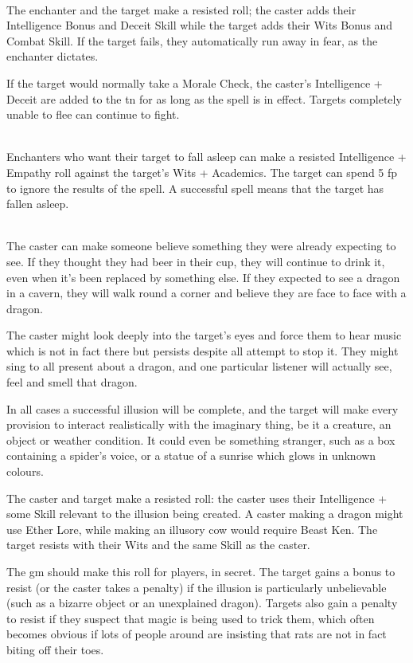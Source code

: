 \begin{multicols}{2}
\\
The enchanter and the target make a resisted roll; the caster adds their Intelligence Bonus and Deceit Skill while the target adds their Wits Bonus and Combat Skill. If the target fails, they automatically run away in fear, as the enchanter dictates.

If the target would normally take a Morale Check, the caster's Intelligence + Deceit are added to the \gls{tn} for as long as the spell is in effect.
Targets completely unable to flee can continue to fight.

\\
Enchanters who want their target to fall asleep can make a resisted Intelligence + Empathy roll against the target's Wits + Academics.
The target can spend 5 \gls{fp} to ignore the results of the spell. A successful spell means that the target has fallen asleep.

\\
The caster can make someone believe something they were already expecting to see.
If they thought they had beer in their cup, they will continue to drink it, even when it's been replaced by something else.
If they expected to see a dragon in a cavern, they will walk round a corner and believe they are face to face with a dragon.

The caster might look deeply into the target's eyes and force them to hear music which is not in fact there but persists despite all attempt to stop it. They might sing to all present about a dragon, and one particular listener will actually see, feel and smell that dragon.

In all cases a successful illusion will be complete, and the target will make every provision to interact realistically with the imaginary thing, be it a creature, an object or weather condition. It could even be something stranger, such as a box containing a spider's voice, or a statue of a sunrise which glows in unknown colours.

The caster and target make a resisted roll: the caster uses their Intelligence + some Skill relevant to the illusion being created. A caster making a dragon might use Ether Lore, while making an illusory cow would require Beast Ken. The target resists with their Wits and the same Skill as the caster.

The \gls{gm} should make this roll for players, in secret. The target gains a bonus to resist (or the caster takes a penalty) if the illusion is particularly unbelievable (such as a bizarre object or an unexplained dragon). Targets also gain a penalty to resist if they suspect that magic is being used to trick them, which often becomes obvious if lots of people around are insisting that rats are not in fact biting off their toes.


\end{multicols}
